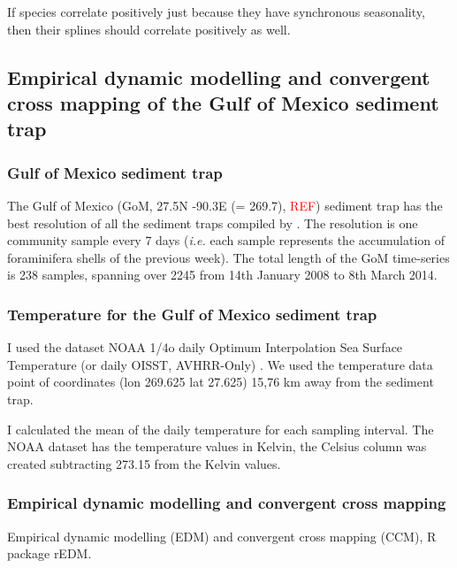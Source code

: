 If species correlate positively just because they have synchronous seasonality, then their splines should correlate positively as well. 



\subsection{Empirical dynamic modelling and convergent cross mapping of the Gulf of Mexico sediment trap}

\subsubsection{Gulf of Mexico sediment trap}
The Gulf of Mexico (GoM, 27.5N -90.3E (= 269.7), \textcolor{red}{REF}) sediment trap has the best resolution of all the sediment traps compiled by \cite{jonkers2015global}. The resolution is one community sample every 7 days (\textit{i.e.} each sample represents the accumulation of foraminifera shells of the previous week). The total length of the GoM time-series is 238 samples, spanning over 2245 from 14th January 2008 to 8th March 2014.

\subsubsection{Temperature for the Gulf of Mexico sediment trap}
I used the dataset NOAA 1/4o daily Optimum Interpolation Sea Surface Temperature (or daily OISST, AVHRR-Only) \citep{smith2016oisst}.  %
We used the temperature data point of coordinates (lon 269.625  lat 27.625) 15,76 km away from the sediment trap. 

I calculated the mean of the daily temperature for each sampling interval. The NOAA dataset has the temperature values in Kelvin, the Celsius column was created subtracting 273.15 from the Kelvin values. 


\subsubsection{Empirical dynamic modelling and convergent cross mapping}
Empirical dynamic modelling (EDM) and convergent cross mapping (CCM), R package rEDM.




